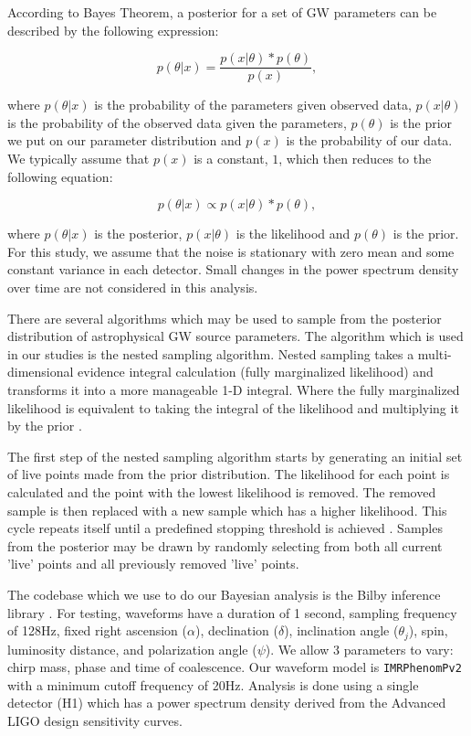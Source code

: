\documentclass{nature}
\begin{document}
According to Bayes Theorem, a posterior for a set of GW parameters can be described by the following expression:

\begin{equation}
    p(\theta|x) = \frac{p(x|\theta) * p(\theta)}{p(x)},
\end{equation}

where $p(\theta|x)$ is the probability of the parameters given observed data, $p(x|\theta)$ is the probability of the observed data given the parameters, $p(\theta)$ is the prior we put on our parameter distribution and $p(x)$ is the probability of our data. We typically assume that $p(x)$ is a constant, $1$, which then reduces to the following equation:

\begin{equation}
    p(\theta|x) \propto p(x|\theta) * p(\theta),
\end{equation}

where $p(\theta|x)$ is the posterior, $p(x|\theta)$ is the likelihood and $p(\theta)$ is the prior. For this study, we assume that the noise is stationary with zero mean and some constant variance in each detector. Small changes in the power spectrum density over time are not considered in this analysis. 

There are several algorithms which may be used to sample from the posterior distribution of astrophysical GW source parameters. The algorithm which is used in our studies is the nested sampling algorithm. Nested sampling takes a multi-dimensional evidence integral calculation (fully marginalized likelihood) and transforms it into a more manageable 1-D integral. Where the fully marginalized likelihood is equivalent to taking the integral of the likelihood and multiplying it by the prior \cite{1409.7215}.


The first step of the nested sampling algorithm starts by generating an initial set of live points made from the prior distribution. The likelihood for each point is calculated and the point with the lowest likelihood is removed. The removed sample is then replaced with a new sample which has a higher likelihood. This cycle repeats itself until a predefined stopping threshold is achieved \cite{1409.7215}. Samples from the posterior may be drawn by randomly selecting from both all current 'live' points and all previously removed 'live' points. 

The codebase which we use to do our Bayesian analysis is the Bilby inference library \cite{1811.02042}. For testing, waveforms have a duration of 1 second, sampling frequency of 128Hz, fixed right ascension ($\alpha$), declination ($\delta$), inclination angle ($\theta_j$), spin, luminosity distance, and polarization angle ($\psi$). We allow 3 parameters to vary: chirp mass, phase and time of coalescence. Our waveform model is \texttt{IMRPhenomPv2} with a minimum cutoff frequency of 20Hz. Analysis is done using a single detector (H1) which has a power spectrum density derived from the Advanced LIGO design sensitivity curves.
\end{document}
